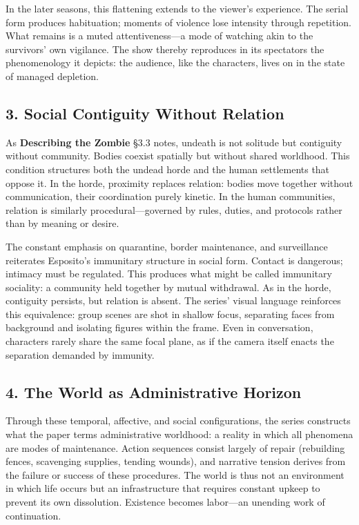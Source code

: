 \documentclass[11pt]{article}
\begin{document}
In the later seasons, this flattening extends to the viewer’s experience.  The serial form produces habituation; moments of violence lose intensity through repetition.  What remains is a muted attentiveness—a mode of watching akin to the survivors’ own vigilance.  The show thereby reproduces in its spectators the phenomenology it depicts: the audience, like the characters, lives on in the state of managed depletion.  
\subsection*{3. Social Contiguity Without Relation}
\label{sec:org7da5b02}

As \textbf{Describing the Zombie} §3.3 notes, undeath is not solitude but contiguity without community.  Bodies coexist spatially but without shared worldhood.  This condition structures both the undead horde and the human settlements that oppose it.  In the horde, proximity replaces relation: bodies move together without communication, their coordination purely kinetic.  In the human communities, relation is similarly procedural—governed by rules, duties, and protocols rather than by meaning or desire.  

The constant emphasis on quarantine, border maintenance, and surveillance reiterates Esposito’s immunitary structure in social form.  Contact is dangerous; intimacy must be regulated.  This produces what might be called immunitary sociality: a community held together by mutual withdrawal.  As in the horde, contiguity persists, but relation is absent.  The series’ visual language reinforces this equivalence: group scenes are shot in shallow focus, separating faces from background and isolating figures within the frame.  Even in conversation, characters rarely share the same focal plane, as if the camera itself enacts the separation demanded by immunity.  
\subsection*{4. The World as Administrative Horizon}
\label{sec:org026b310}

Through these temporal, affective, and social configurations, the series constructs what the paper terms administrative worldhood: a reality in which all phenomena are modes of maintenance.  Action sequences consist largely of repair (rebuilding fences, scavenging supplies, tending wounds), and narrative tension derives from the failure or success of these procedures.  The world is thus not an environment in which life occurs but an infrastructure that requires constant upkeep to prevent its own dissolution.  Existence becomes labor—an unending work of continuation.  
\end{document}
